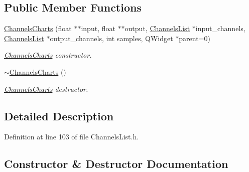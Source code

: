 \subsection*{Public Member Functions}
\begin{DoxyCompactItemize}
\item 
\hyperlink{class_channels_charts_a6fd985f15981dde4bca95c029ec3549f}{Channels\+Charts} (float $\ast$$\ast$input, float $\ast$$\ast$output, \hyperlink{class_channels_list}{Channels\+List} $\ast$input\+\_\+channels, \hyperlink{class_channels_list}{Channels\+List} $\ast$output\+\_\+channels, int samples, Q\+Widget $\ast$parent=0)
\begin{DoxyCompactList}\small\item\em \hyperlink{class_channels_charts}{Channels\+Charts} constructor. \end{DoxyCompactList}\item 
\mbox{\label{class_channels_charts_a459f485f41a6734fe486358502cb8cca}} 
\hyperlink{class_channels_charts_a459f485f41a6734fe486358502cb8cca}{$\sim$\+Channels\+Charts} ()
\begin{DoxyCompactList}\small\item\em \hyperlink{class_channels_charts}{Channels\+Charts} destructor. \end{DoxyCompactList}\end{DoxyCompactItemize}


\subsection{Detailed Description}


Definition at line 103 of file Channels\+List.\+h.



\subsection{Constructor \& Destructor Documentation}
\mbox{\label{class_channels_charts_a6fd985f15981dde4bca95c029ec3549f}} 
